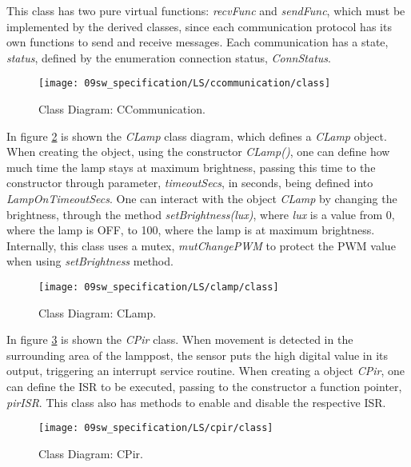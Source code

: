 This class has two pure virtual functions: \textit{recvFunc} and \textit{sendFunc}, which must be implemented by the derived classes, since each communication protocol has its own functions to send and receive messages. Each communication has a state, \textit{status}, defined by the enumeration connection status, \textit{ConnStatus}.

\begin{figure}[H]
	\centering
	\texttt{[image: 09sw\_specification/LS/ccommunication/class]}
	\caption{Class Diagram: CCommunication.}
	\label{fig:CCommunicationClass}
\end{figure}

\clearpage
{}

In figure \ref{fig:classlamp} is shown the \textit{CLamp} class diagram, which defines a \textit{CLamp} object. When creating the object, using the constructor \textit{CLamp()}, one can define how much time the lamp stays at maximum brightness, passing this time to the constructor through parameter, \textit{timeoutSecs}, in seconds, being defined into \textit{LampOnTimeoutSecs}.
One can interact with the object \textit{CLamp} by changing the brightness, through the method \textit{setBrightness(lux)}, where \textit{lux} is a value from 0, where the lamp is OFF, to 100, where the lamp is at maximum brightness.  Internally, this class uses a mutex, \textit{mutChangePWM} to protect the PWM value when using \textit{setBrightness} method. 

\begin{figure}[H]
	\centering
	\texttt{[image: 09sw\_specification/LS/clamp/class]}
	\caption{Class Diagram: CLamp.}
	\label{fig:classlamp}
\end{figure}

{}

In figure \ref{fig:classpir} is shown the \textit{CPir} class. When movement is detected in the surrounding area of the lamppost, the sensor puts the high digital value in its output, triggering an interrupt service routine. When creating a object \textit{CPir}, one can define the ISR to be executed, passing to the constructor a function pointer, \textit{pirISR}. This class also has methods to enable and disable the respective ISR.

\begin{figure}[H]
	\centering
	\texttt{[image: 09sw\_specification/LS/cpir/class]}
	\caption{Class Diagram: CPir.}
	\label{fig:classpir}
\end{figure}


